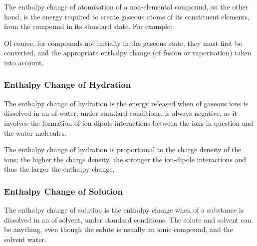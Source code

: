 				The enthalpy change of atomisation of a non-elemental compound, on the other hand, is the energy required to create gaseous
				atoms of its constituent elements, from the compound in its standard state. For example:


				Of course, for compounds not initially in the gaseous state, they must first be converted, and the appropriate enthalpy
				change (of fusion or vaporisation) taken into account.




			\pagebreak
			\subsubsection{Enthalpy Change of Hydration}

				The enthalpy change of hydration is the energy released when  of gaseous ions is dissolved in an
				 of water, under standard conditions.  is always negative, as it involves the
				formation of ion-dipole interactions between the ions in question and the water molecules.


				The enthalpy change of hydration is proportional to the charge density of the ions; the higher the charge density,
				the stronger the ion-dipole interactions and thus the larger the enthalpy change.


			\subsubsection{Enthalpy Change of Solution}

				The enthalpy change of solution is the enthalpy change when  of a substance is dissolved in an 
				of solvent, under standard conditions. The solute and solvent can be anything, even though the solute is usually an ionic compound,
				and the solvent water.

